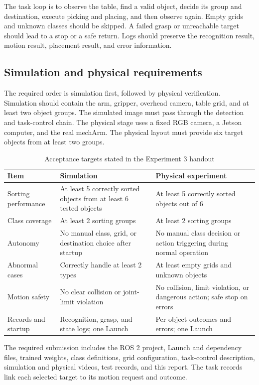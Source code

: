 The task loop is to observe the table, find a valid object, decide its group and destination, execute picking and placing, and then observe again. Empty grids and unknown classes should be skipped. A failed grasp or unreachable target should lead to a stop or a safe return. Logs should preserve the recognition result, motion result, placement result, and error information.

\subsection{Simulation and physical requirements}
The required order is simulation first, followed by physical verification. Simulation should contain the arm, gripper, overhead camera, table grid, and at least two object groups. The simulated image must pass through the detection and task-control chain. The physical stage uses a fixed RGB camera, a Jetson computer, and the real mechArm. The physical layout must provide six target objects from at least two groups.

\begin{table}[H]\tabstart
\caption{Acceptance targets stated in the Experiment 3 handout}
\begin{tabularx}{\textwidth}{@{}L{3.1cm}Y Y@{}}
\toprule Item & Simulation & Physical experiment\\\midrule
Sorting performance & At least 5 correctly sorted objects from at least 6 tested objects & At least 5 correctly sorted objects out of 6\\
Class coverage & At least 2 sorting groups & At least 2 sorting groups\\
Autonomy & No manual class, grid, or destination choice after startup & No manual class decision or action triggering during normal operation\\
Abnormal cases & Correctly handle at least 2 types & At least empty grids and unknown objects\\
Motion safety & No clear collision or joint-limit violation & No collision, limit violation, or dangerous action; safe stop on errors\\
Records and startup & Recognition, grasp, and state logs; one Launch & Per-object outcomes and errors; one Launch\\
\bottomrule
\end{tabularx}
\end{table}

The required submission includes the ROS 2 project, Launch and dependency files, trained weights, class definitions, grid configuration, task-control description, simulation and physical videos, test records, and this report. The task records link each selected target to its motion request and outcome.

